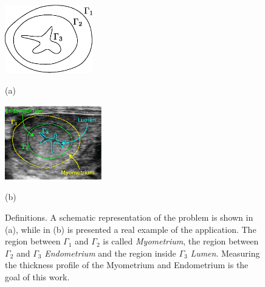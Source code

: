 \documentclass{article}
\begin{document}
\begin{figure}[t]
\begin{minipage}[b]{.45\linewidth}
  \centering
  \centerline{\includegraphics[width=3.8cm]{pics/defs2}}
  \centerline{(a)}\medskip
\end{minipage}\hfill
\begin{minipage}[b]{.52\linewidth}
  \centering
  \centerline{\includegraphics[width=4.2cm]{pics/defsEndo}}
  \centerline{(b)}\medskip
\end{minipage}
\vspace{-10pt}
\caption{Definitions. A schematic representation of the problem is shown in (a), while in (b) is presented a real example of the application. The region between $\Gamma_1$ and $\Gamma_2$ is called \emph{Myometrium}, the region between $\Gamma_2$ and $\Gamma_3$ \emph{Endometrium} and the region inside $\Gamma_3$ \emph{Lumen}. Measuring the thickness profile of the Myometrium and Endometrium is the goal of this work.}
\vspace{-5pt}
\label{fig:defs}
\end{figure}
\end{document}
